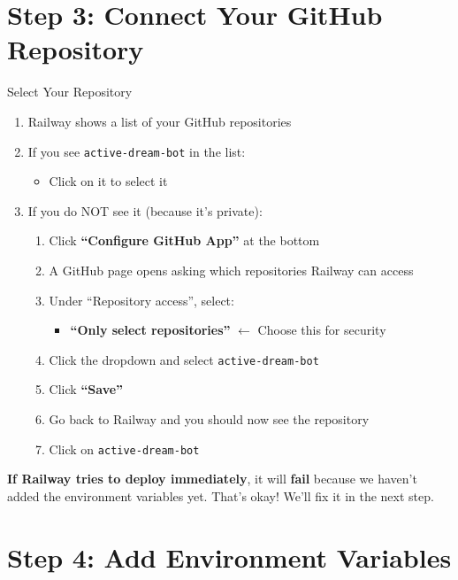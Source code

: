 \section{Step 3: Connect Your GitHub Repository}

\begin{stepbox}{Select Your Repository}
\begin{enumerate}[leftmargin=1.5cm]
    \item Railway shows a list of your GitHub repositories
    \item If you see \texttt{active-dream-bot} in the list:
    \begin{itemize}
        \item Click on it to select it
    \end{itemize}
    \item If you do NOT see it (because it's private):
    \begin{enumerate}
        \item Click \textbf{``Configure GitHub App''} at the bottom
        \item A GitHub page opens asking which repositories Railway can access
        \item Under ``Repository access'', select:
        \begin{itemize}
            \item \textbf{``Only select repositories''} $\leftarrow$ Choose this for security
        \end{itemize}
        \item Click the dropdown and select \texttt{active-dream-bot}
        \item Click \textbf{``Save''}
        \item Go back to Railway and you should now see the repository
        \item Click on \texttt{active-dream-bot}
    \end{enumerate}
\end{enumerate}
\end{stepbox}

\begin{warningbox}
\textbf{If Railway tries to deploy immediately}, it will \textbf{fail} because we haven't added the environment variables yet. That's okay! We'll fix it in the next step.
\end{warningbox}

\section{Step 4: Add Environment Variables}

